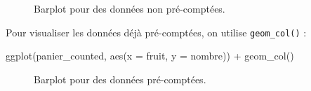 \documentclass[
  a4paper,
  DIV=11,
  numbers=noendperiod,
  oneside]{scrreprt}
\newenvironment{Shaded}{}{}
\newcommand{\AttributeTok}[1]{\textcolor[rgb]{0.84,0.23,0.29}{#1}}
\newcommand{\FunctionTok}[1]{\textcolor[rgb]{0.44,0.26,0.76}{#1}}
\newcommand{\NormalTok}[1]{\textcolor[rgb]{0.14,0.16,0.18}{#1}}
\newcommand{\SpecialCharTok}[1]{\textcolor[rgb]{0.00,0.36,0.77}{#1}}
\begin{document}
\begin{figure}[H]


\caption{\label{fig-barplot}Barplot pour des données non pré-comptées.}

\end{figure}%

Pour visualiser les données déjà pré-comptées, on utilise
\texttt{geom\_col()} :

\begin{Shaded}
\begin{Highlighting}[]
\FunctionTok{ggplot}\NormalTok{(panier\_counted, }\FunctionTok{aes}\NormalTok{(}\AttributeTok{x =}\NormalTok{ fruit, }\AttributeTok{y =}\NormalTok{ nombre)) }\SpecialCharTok{+}
  \FunctionTok{geom\_col}\NormalTok{()}
\end{Highlighting}
\end{Shaded}

\begin{figure}[H]


\caption{\label{fig-barplotcol}Barplot pour des données pré-comptées.}

\end{figure}%
\end{document}
